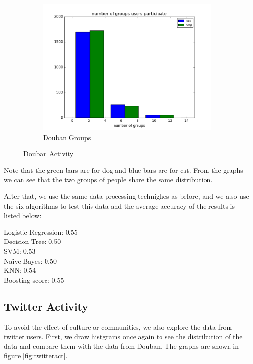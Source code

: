 \documentclass[12pt]{article}
\begin{document}
\begin{figure}[h!]
\begin{subfigure}[b]{0.3\linewidth}
    \includegraphics[width=\linewidth]{../MovieFollowInformation/groups.png}
  \caption{Douban Groups}
  \end{subfigure}
  \caption{Douban Activity}
  \label{fig:doubanact}
\end{figure}

Note that the green bars are for dog and blue bars are for cat. From the graphs we can see that the two groups of people share the same distribution.

After that, we use the same data processing technighes as before, and we also use the six algorithms to test this data and the average accuracy of the results is listed below:

Logistic Regression:  0.55 \\
Decision Tree:  0.50 \\
SVM:  0.53 \\
Na\"{\i}ve Bayes:  0.50 \\
KNN:  0.54 \\
Boosting score:  0.55

\subsection{Twitter Activity}
To avoid the effect of culture or communities, we also explore the data from twitter users. First, we draw histgrams once again to see the distribution of the data and compare them with the data from Douban. The graphs are shown in figure \ref{fig:twitteract}.
\end{document}
